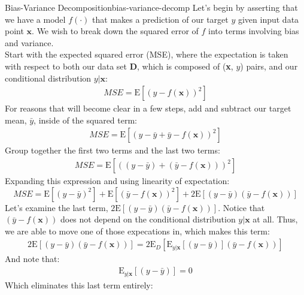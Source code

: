 \begin{derivation}{Bias-Variance Decomposition}{bias-variance-decomp}
    Let's begin by asserting that we have a model $f(\cdot)$ that makes a prediction of our target $y$ given input data point $\textbf{x}$. We wish to break down the squared error of $f$ into terms involving bias and variance. \\

    Start with the expected squared error (MSE), where the expectation is taken with respect to both our data set $\textbf{D}$, which is composed of (\textbf{x}, $y$) pairs, and our conditional distribution $y | \textbf{x}$:
    \begin{align*}
        \textit{MSE} = \mathrm{E}[(y - f(\textbf{x}))^{2}]
    \end{align*}
    For reasons that will become clear in a few steps, add and subtract our target mean, $\bar{y}$, inside of the squared term:
    \begin{align*}
        \textit{MSE} = \mathrm{E}[(y - \bar{y} + \bar{y} - f(\textbf{x}))^{2}]
    \end{align*}
    Group together the first two terms and the last two terms:
    \begin{align*}
        \textit{MSE} = \mathrm{E}[((y - \bar{y}) + (\bar{y} - f(\textbf{x})))^{2}]
    \end{align*}
    Expanding this expression and using linearity of expectation:
    \begin{equation} \label{bias-variance-intermediate-1}
        \textit{MSE} = \mathrm{E}[(y - \bar{y})^{2}] + \mathrm{E}[(\bar{y} - f(\textbf{x}))^{2}] + 2\mathrm{E}[(y - \bar{y})(\bar{y} - f(\textbf{x}))]
    \end{equation}
    Let's examine the last term, $2\mathrm{E}[(y - \bar{y})(\bar{y} - f(\textbf{x}))]$. Notice that $(\bar{y} - f(\textbf{x}))$ does not depend on the conditional distribution $y|\textbf{x}$ at all. Thus, we are able to move one of those expecations in, which makes this term:
    \begin{align*}
        2\mathrm{E}[(y - \bar{y})(\bar{y} - f(\textbf{x}))] = 2\mathrm{E}_{D}[\mathrm{E}_{y|\textbf{x}}[(y - \bar{y})](\bar{y} - f(\textbf{x}))]
    \end{align*}
    And note that:
    \begin{align*}
        \mathrm{E}_{y|\textbf{x}}[(y - \bar{y})] = 0
    \end{align*}
    Which eliminates this last term entirely:
    \begin{align*}

\end{align*}
\end{derivation}
